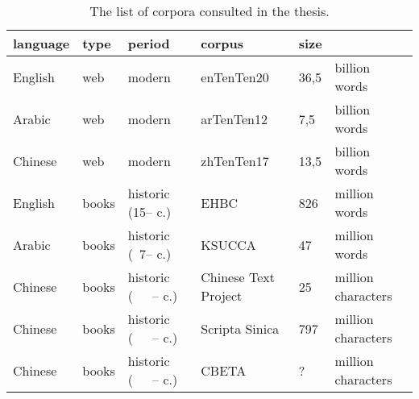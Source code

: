 \begin{table}[ht]
    \begin{tabularx}{\textwidth}{@{}lllLl@{}l@{}}
    \toprule
    \textbf{language} & \textbf{type} & \textbf{period} &  \textbf{corpus} & \textbf{size} & \\ \midrule
    English           & web      & modern                       & enTenTen20 & 36,5 & billion words    \\
    Arabic            & web      & modern                       & arTenTen12 & 7,5 & billion words    \\
    Chinese           & web      & modern                       & zhTenTen17 & 13,5 & billion words    \\ \midrule
    English           & books    & historic (15-- c.)   & EHBC      & 826   & million words    \\
    Arabic            & books    & historic (~7-- c.)    & KSUCCA    & 47    & million words    \\
    Chinese           & books    & historic (~~~-- c.)     & Chinese Text Project    & 25    & million characters \\ 
    Chinese           & books    & historic (~~~-- c.)     & Scripta Sinica        & 797   & million characters \\ 
    Chinese           & books    & historic (~~~-- c.)     & CBETA        & ?   & million characters \\ 
    \bottomrule
    \end{tabularx}
    \caption[The list of corpora consulted in the thesis.]{The list of corpora consulted in the thesis.}
    \label{table:corpora}
\end{table}

